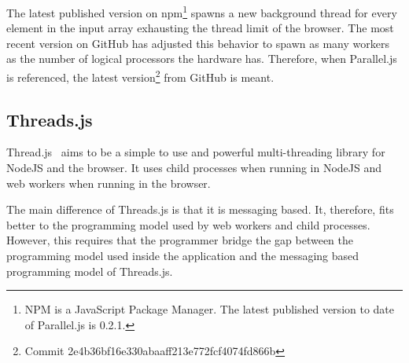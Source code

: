 The latest published version on npm\footnote{NPM is a JavaScript Package Manager. The latest published version to date of Parallel.js is 0.2.1.} spawns a new background thread for every element in the input array exhausting the thread limit of the browser. The most recent version on GitHub has adjusted this behavior to spawn as many workers as the number of logical processors the hardware has. Therefore, when Parallel.js is referenced, the latest version\footnote{Commit 2e4b36bf16e330abaaff213e772fcf4074fd866b} from GitHub is meant.

\subsection{Threads.js}
Thread.js~\cite{Wermke2016} aims to be a simple to use and powerful multi-threading library for NodeJS and the browser. It uses child processes when running in NodeJS and web workers when running in the browser.

The main difference of Threads.js is that it is messaging based. It, therefore, fits better to the programming model used by web workers and child processes. However, this requires that the programmer bridge the gap between the programming model used inside the application and the messaging based programming model of Threads.js.
